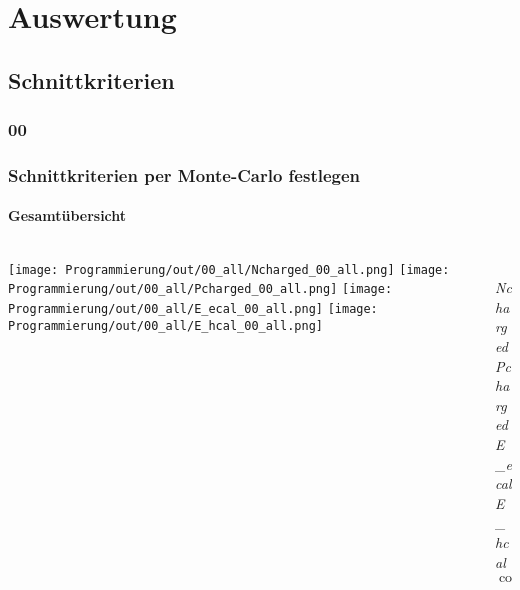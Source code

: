 \documentclass{beamer}
\begin{document}
\section{Auswertung}

\subsection{Schnittkriterien}
\subsubsection{00}
\begin{frame}
	\frametitle{Schnittkriterien per Monte-Carlo festlegen}
	\framesubtitle{Gesamtübersicht}
	\begin{columns}
		\begin{column}{0.95\textwidth}
			\texttt{[image: Programmierung/out/00\_all/Ncharged\_00\_all.png]}
			\texttt{[image: Programmierung/out/00\_all/Pcharged\_00\_all.png]}
			\newline
			\texttt{[image: Programmierung/out/00\_all/E\_ecal\_00\_all.png]}
			\texttt{[image: Programmierung/out/00\_all/E\_hcal\_00\_all.png]}
		\end{column}
		\begin{column}{0.2\textwidth}
			\\
			{\color{blue}\textit{Ncharged}}\newline
					\\
			{\color{blue}\textit{Pcharged}}\newline
					\\
			{\color[rgb]{0.6,0.6,0}\textit{E\_ecal}}\newline
					\\
			{\color[rgb]{1,0,1}\textit{E\_hcal}}\newline
					\\
			$\cos\_thet$\newline
								\\
			\\
			\\
			\\
			\\
		\end{column}
	\end{columns}
\end{frame}
\end{document}
